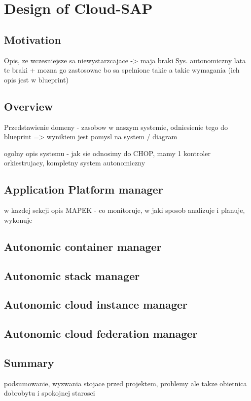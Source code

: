 \chapter{Design of Cloud-SAP}


\section{Motivation}
Opis, ze wczesniejsze sa niewystarzcajace -> maja braki
Sys. autonomiczny lata te braki + mozna go zastosowac bo sa spelnione takie a takie wymagania (ich opis jest w blueprint)

\section{Overview}
Przedstawienie domeny - zasobow w naszym systemie, odniesienie tego do blueprint => wynikiem jest pomysl na system / diagram

ogolny opis systemu - jak sie odnosimy do CHOP, mamy 1 kontroler orkiestrujacy, kompletny system autonomiczny

\section{Application Platform manager}
w kazdej sekcji opis MAPEK - co monitoruje, w jaki sposob analizuje i planuje, wykonuje

\section{Autonomic container manager}

\section{Autonomic stack manager}

\section{Autonomic cloud instance manager}

\section{Autonomic cloud federation manager}

\section{Summary}
podsumowanie, wyzwania stojace przed projektem, problemy ale takze obietnica dobrobytu i spokojnej starosci




